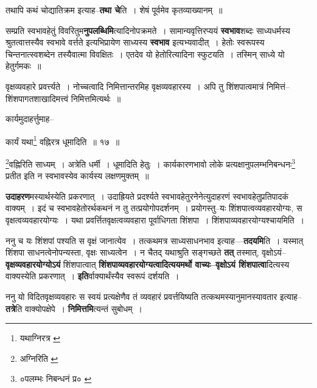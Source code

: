 \documentclass[article,12pt,a4paper]{memoir}
\begin{document}
	  \pstart तथापि कथं चोद्यातिक्रम इत्याह--\textbf{तथा चे}ति । शेषं पूर्वमेव कृतव्याख्यानम् ॥
	\pend
      

	  \pstart सम्प्रति स्वभावहेतुं विवरितुम\textbf{नुपलब्धिमि}त्यादिनोपक्रमते । सामान्यवृत्तिरप्ययं \textbf{स्वभाव}शब्दः साध्यधर्मस्य श्रुतत्वात्तस्यैव स्वभावे वर्त्तते इत्यभिप्रायेण साध्यस्य \textbf{स्वभाव} इत्यभ्यवादीत् । हेतोः स्वरूपस्य चिन्तनात्स्वशब्देन तस्यैवात्मा विवक्षितः । एतदेव यो हेतोरित्यादिना स्फुटयति । तस्मिन् साध्ये यो हेतुर्गमकः ॥
	\pend
      \leavevmode{}
	  \bigskip
	  \begingroup
	

	  \pstart वृक्षव्यवहारे प्रवर्त्त्यते । नोच्चत्वादि निमित्तान्तरमिह वृक्षव्यवहारस्य । अपि तु शिंशपात्वमात्रं निमित्तं--शिंशपागतशाखादिमत्त्वं निमित्तमित्यर्थः ॥
	\pend
       

	  \pstart कार्यमुदाहर्त्तुमाह--
	\pend
       
	  \bigskip
	  \begingroup
	

	  \pstart कार्यं यथा\footnote{यथाग्निरत्र \cite{dp-msB} \cite{dp-msD} \cite{dp-edP} \cite{dp-edH} \cite{dp-edE} \cite{dp-edN}} वह्निरत्र धूमादिति ॥ १७ ॥
	\pend
      
	  \endgroup
	 

	  \pstart \footnote{अग्निरिति \cite{dp-msB} \cite{dp-msD} \cite{dp-edP} \cite{dp-edH} \cite{dp-edE} \cite{dp-edN}}वह्निरिति साध्यम् । अत्रेति धर्मी । धूमादिति हेतुः । कार्यकारणभावो लोके प्रत्यक्षानुपलम्भनिबन्धनः\footnote{०पलम्भः निबन्धनं प्र० \cite{dp-msB}} प्रतीत इति न स्वभावस्येव कार्यस्य लक्षणमुक्तम् ॥
	\pend
      
	  \endgroup
	

	  \pstart \textbf{उदाहरण}मस्यार्थस्येति प्रकरणात् । उदाह्रियते प्रदर्श्यते स्वभावहेतुरनेनेत्युदाहरणं स्वभावहेतुप्रतिपादकं वाक्यम् । इदं च स्वभावहेतोरर्थकथनं न तु तत्प्रयोगोपदर्शनम् । प्रयोगस्तु--यः शिंशपात्वव्यवहारयोग्यः, स वृक्षत्वव्यवहारयोग्यः । यथा प्रवर्त्तितवृक्षत्वव्यवहारा पूर्वाधिगता शिंशपा । शिंशपाव्यवहारयोग्यश्चायमिति ।
	\pend
      

	  \pstart ननु च यः शिंशपां पश्यति स वृक्षं जानात्येव । तत्कथमत्र साध्यसाधनभाव इत्याह—\textbf{तदयमि}ति । यस्मात् शिंशपा साधनत्वेनोपन्यस्ता, वृक्षः साध्यत्वेन । न चैतद् यथाश्रुति सङ्गच्छते \textbf{तत्} तस्मात्, वृक्षोऽयं--\textbf{वृक्षव्यवहारयो}\leavevmode{}\textbf{ग्योऽयं} शिंशपात्वात् \textbf{शिंशपाव्यवहारयोग्यत्वादित्ययमर्थो वाच्यः--वृक्षोऽयं शिंशपात्वा}दित्यस्य वाक्यस्येति प्रकरणात् । \textbf{इति}र्वाक्यार्थंस्यैव स्वरूपं दर्शयति ।
	\pend
      

	  \pstart ननु यो विदितवृक्षव्यवहारः स स्वयं प्रत्यक्षेणैव तं व्यवहारं प्रवर्त्तयिष्यति तत्कथमस्यानुमानस्यावतार इत्याह--\textbf{तत्रे}ति वाक्योपक्षेपे । \textbf{निमित्तमि}त्यन्तं सुबोधम् ।
	\pend
      
\end{document}
